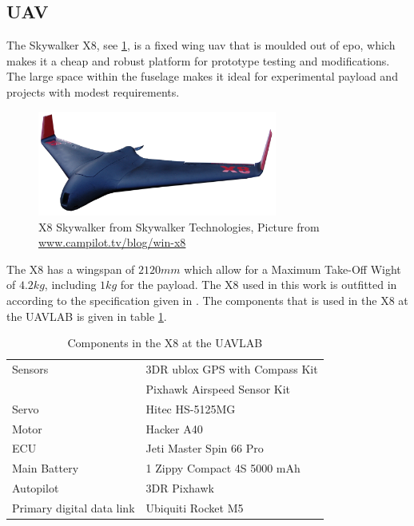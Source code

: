 \subsection{UAV}\label{ss:SkywalkerX8}
The Skywalker X8, see \ref{figure:skywalkerX8}, is a fixed wing \acrfull{uav} that is moulded out of \gls{epo}, which makes it a cheap and robust platform for prototype testing and modifications. The large space within the fuselage makes it ideal for experimental payload and projects with modest requirements.
\begin{figure}[H]
	\centering
		\includegraphics[width=0.7\textwidth]{figs/Wing-X8_white-bgd2.png}
		\caption{X8 Skywalker from Skywalker Technologies, Picture from \url{www.campilot.tv/blog/win-x8}}
		\label{figure:skywalkerX8}
\end{figure}
The X8 has a wingspan of $2120mm$ which allow for a Maximum Take-Off Wight of $4.2kg$, including $1kg$ for the payload. The X8 used in this work is outfitted in according to the specification given in \citep{KlausenX8}. The components that is used in the X8 at the UAVLAB is given in table \ref{tb:X8Components}.
\begin{table}[H]
\begin{center}
\begin{tabular}{l l}
Sensors & 3DR ublox GPS with Compass Kit\\&Pixhawk Airspeed Sensor Kit \\
Servo & Hitec HS-5125MG \\
Motor & Hacker A40 \\
ECU & Jeti Master Spin 66 Pro \\
Main Battery & 1 Zippy Compact 4S 5000 mAh\\
Autopilot & 3DR Pixhawk \\
Primary digital data link & Ubiquiti Rocket M5
\end{tabular}
\end{center}
\caption{Components in the X8 at the UAVLAB}
\label{tb:X8Components}
\end{table}
